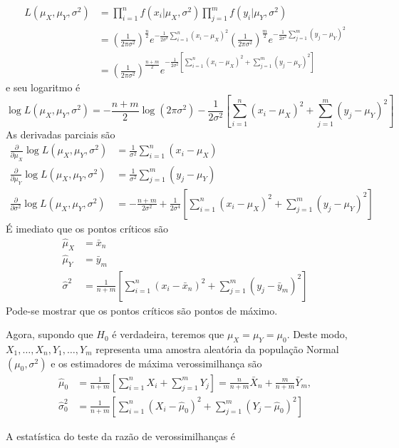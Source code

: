 \documentclass[
  letterpaper,
  DIV=11,
  numbers=noendperiod]{scrartcl}
\begin{document}
\[\begin{align}L(\mu_X,\mu_Y,\sigma^2)&=\prod_{i=1}^n f(x_i|\mu_X,\sigma^2)\prod_{j=1}^m f(y_i|\mu_Y,\sigma^2)\\ &=\left(\frac{1}{2\pi\sigma^2}\right)^{\frac{n}{2}}e^{-\frac{1}{2\sigma^2}\sum_{i=1}^{n}(x_i-\mu_X)^2}\left(\frac{1}{2\pi\sigma^2}\right)^{\frac{m}{2}}e^{-\frac{1}{2\sigma^2}\sum_{j=1}^m(y_j-\mu_Y)^2}\\&=\left(\frac{1}{2\pi\sigma^2}\right)^{\frac{n+m}{2}}e^{-\frac{1}{2\sigma^2}\left[\sum_{i=1}^n(x_i-\mu_X)^2+\sum_{j=1}^m(y_j-\mu_Y)^2\right]}\end{align}\]
e seu logaritmo é
\[\log L(\mu_X,\mu_Y,\sigma^2)=-\frac{n+m}{2}\log(2\pi\sigma^2)-\frac{1}{2\sigma^2}\left[\sum_{i=1}^n(x_i-\mu_X)^2+\sum_{j=1}^m(y_j-\mu_Y)^2\right]\]
As derivadas parciais são
\[\begin{align}\frac{\partial}{\partial\mu_X}\log L(\mu_X,\mu_Y,\sigma^2)&=\frac{1}{\sigma^2}\sum_{i=1}^n(x_i-\mu_X)\\
\frac{\partial}{\partial\mu_Y}\log L(\mu_X,\mu_Y,\sigma^2)&=\frac{1}{\sigma^2}\sum_{j=1}^m(y_j-\mu_Y)\\
\frac{\partial}{\partial\sigma^2}\log L(\mu_X,\mu_Y,\sigma^2)&=-\frac{n+m}{2\sigma^2}+\frac{1}{2\sigma^4}\left[\sum_{i=1}^n(x_i-\mu_X)^2+\sum_{j=1}^m(y_j-\mu_Y)^2\right]
\end{align}\] É imediato que os pontos críticos são \[\begin{align}
\hat{\mu}_X&=\bar{x}_n\\
\hat{\mu}_Y&=\bar{y}_m\\
\hat{\sigma}^2&=\frac{1}{n+m}\left[\sum_{i=1}^n(x_i-\bar{x}_n)^2+\sum_{j=1}^m(y_j-\bar{y}_m)^2\right]
\end{align}\] Pode-se mostrar que os pontos críticos são pontos de
máximo.

Agora, supondo que \(H_0\) é verdadeira, teremos que
\(\mu_X=\mu_Y=\mu_0\). Deste modo, \(X_1,\ldots,X_n,Y_1,\ldots,Y_m\)
representa uma amostra aleatória da população Normal\((\mu_0,\sigma^2)\)
e os estimadores de máxima verossimilhança são \[\begin{align}
\hat{\mu}_0&=\frac{1}{n+m}\left[\sum_{i=1}^n X_i + \sum_{j=1}^m Y_j\right]=\frac{n}{n+m}\bar{X}_n+\frac{m}{n+m}\bar{Y}_m,\\
\hat{\sigma}^2_0&=\frac{1}{n+m}\left[\sum_{i=1}^n(X_i-\hat{\mu}_0)^2+\sum_{j=1}^m(Y_j-\hat{\mu}_0)^2\right]
\end{align}\]

A estatística do teste da razão de verossimilhanças é
\end{document}
